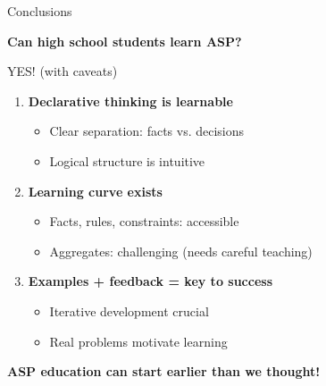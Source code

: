 \documentclass[aspectratio=169]{beamer}
\begin{document}
\begin{frame}{Conclusions}

    \LARGE \textbf{Can high school students learn ASP?}

    \vspace{0.5cm}

    \Large \textcolor{green!60!black}{YES!} \normalsize (with caveats)

    \vspace{0.7cm}

    \begin{enumerate}
        \item \textbf{Declarative thinking is learnable}
        \begin{itemize}
            \item Clear separation: facts vs. decisions
            \item Logical structure is intuitive
        \end{itemize}

        \vspace{0.3cm}

        \item \textbf{Learning curve exists}
        \begin{itemize}
            \item Facts, rules, constraints: accessible
            \item Aggregates: challenging (needs careful teaching)
        \end{itemize}

        \vspace{0.3cm}

        \item \textbf{Examples + feedback = key to success}
        \begin{itemize}
            \item Iterative development crucial
            \item Real problems motivate learning
        \end{itemize}
    \end{enumerate}

    \vspace{0.5cm}

    \vspace{0.1cm}

    \centering
    \textbf{ASP education can start earlier than we thought!}
\end{frame}
\end{document}
